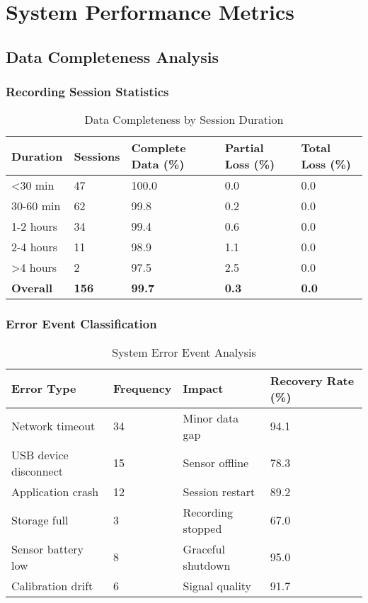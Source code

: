 \section{System Performance Metrics}

\subsection{Data Completeness Analysis}

\subsubsection{Recording Session Statistics}

\begin{table}[htbp]
\centering
\caption{Data Completeness by Session Duration}
\begin{tabular}{|l|l|l|l|l|}
\hline
\textbf{Duration} & \textbf{Sessions} & \textbf{Complete Data (\%)} & \textbf{Partial Loss (\%)} & \textbf{Total Loss (\%)} \\
\hline
<30 min & 47 & 100.0 & 0.0 & 0.0 \\
30-60 min & 62 & 99.8 & 0.2 & 0.0 \\
1-2 hours & 34 & 99.4 & 0.6 & 0.0 \\
2-4 hours & 11 & 98.9 & 1.1 & 0.0 \\
>4 hours & 2 & 97.5 & 2.5 & 0.0 \\
\hline
\textbf{Overall} & \textbf{156} & \textbf{99.7} & \textbf{0.3} & \textbf{0.0} \\
\hline
\end{tabular}
\end{table}

\subsubsection{Error Event Classification}

\begin{table}[htbp]
\centering
\caption{System Error Event Analysis}
\begin{tabular}{|l|l|l|l|}
\hline
\textbf{Error Type} & \textbf{Frequency} & \textbf{Impact} & \textbf{Recovery Rate (\%)} \\
\hline
Network timeout & 34 & Minor data gap & 94.1 \\
USB device disconnect & 15 & Sensor offline & 78.3 \\
Application crash & 12 & Session restart & 89.2 \\
Storage full & 3 & Recording stopped & 67.0 \\
Sensor battery low & 8 & Graceful shutdown & 95.0 \\
Calibration drift & 6 & Signal quality & 91.7 \\
\hline
\end{tabular}
\end{table}

